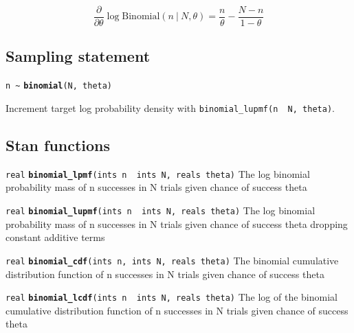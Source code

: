 \documentclass[
  10pt,
]{book}
\begin{document}
\[ \frac{\partial}{\partial \theta} \log \text{Binomial}(n~|~N,\theta)
= \frac{n}{\theta} - \frac{N - n}{1 - \theta} \]

\hypertarget{sampling-statement-3}{%
\subsection{Sampling statement}\label{sampling-statement-3}}

\texttt{n\ \textasciitilde{}} \textbf{\texttt{binomial}}\texttt{(N,\ theta)}

Increment target log probability density with \texttt{binomial\_lupmf(n\ \textbar{}\ N,\ theta)}.

\hypertarget{stan-functions-3}{%
\subsection{Stan functions}\label{stan-functions-3}}


\texttt{real} \textbf{\texttt{binomial\_lpmf}}\texttt{(ints\ n\ \textbar{}\ ints\ N,\ reals\ theta)}\newline
The log binomial probability mass of n successes in N trials given
chance of success theta


\texttt{real} \textbf{\texttt{binomial\_lupmf}}\texttt{(ints\ n\ \textbar{}\ ints\ N,\ reals\ theta)}\newline
The log binomial probability mass of n successes in N trials given
chance of success theta dropping constant additive terms


\texttt{real} \textbf{\texttt{binomial\_cdf}}\texttt{(ints\ n,\ ints\ N,\ reals\ theta)}\newline
The binomial cumulative distribution function of n successes in N
trials given chance of success theta


\texttt{real} \textbf{\texttt{binomial\_lcdf}}\texttt{(ints\ n\ \textbar{}\ ints\ N,\ reals\ theta)}\newline
The log of the binomial cumulative distribution function of n
successes in N trials given chance of success theta
\end{document}
